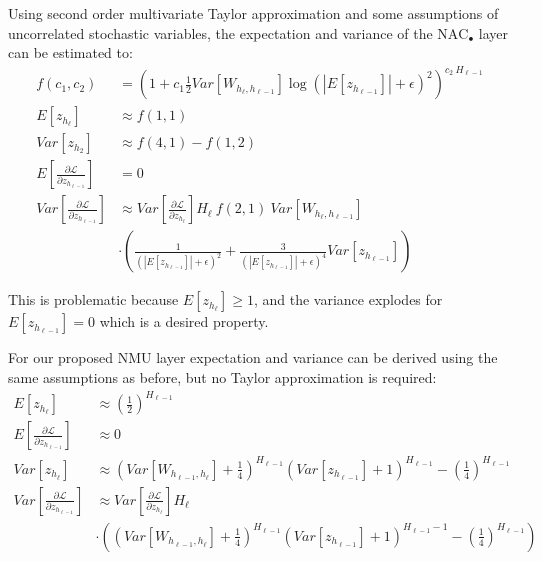 Using second order multivariate Taylor approximation and some assumptions of uncorrelated stochastic variables, the expectation and variance of the $\mathrm{NAC}_{\bullet}$ layer can be estimated to:
\begin{equation}
\begin{aligned}
f(c_1, c_2) &= \left(1 + c_1 \frac{1}{2} Var[W_{h_\ell, h_{\ell-1}}] \log(|E[z_{h_{\ell-1}}]| + \epsilon)^2\right)^{c_2\ H_{\ell-1}} \\
E[z_{h_\ell}] &\approx f\left(1, 1\right) \\
Var[z_{h_2}] &\approx f\left(4, 1\right) - f\left(1, 2\right) \\
E\left[\frac{\partial \mathcal{L}}{\partial z_{h_{\ell-1}}}\right] &= 0 \\
Var\left[\frac{\partial \mathcal{L}}{\partial z_{h_{\ell-1}}}\right] &\approx Var\left[\frac{\partial \mathcal{L}}{\partial z_{h_{\ell}}}\right] H_{\ell}\ f\left(2, 1\right)\ Var[W_{h_{\ell}, h_{\ell-1}}] \\
&\cdot \left(\frac{1}{\left(|E[z_{h_{\ell-1}}]| + \epsilon\right)^2} + \frac{3}{\left(|E[z_{h_{\ell-1}}]| + \epsilon\right)^4} Var[z_{h_{\ell-1}}]\right)
\end{aligned}
\end{equation}

This is problematic because $E[z_{h_\ell}] \ge 1$, and the variance explodes for $E[z_{h_{\ell-1}}] = 0$ which is a desired property.

For our proposed NMU layer expectation and variance can be derived using the same assumptions as before, but no Taylor approximation is required:
\begin{equation}
\begin{aligned}
E[z_{h_\ell}] &\approx \left(\frac{1}{2}\right)^{H_{\ell-1}} \\
E\left[\frac{\partial \mathcal{L}}{\partial z_{h_{\ell-1}}}\right] &\approx 0 \\
Var[z_{h_\ell}] &\approx \left(Var[W_{h_{\ell-1},h_\ell}] + \frac{1}{4}\right)^{H_{\ell-1}} \left(Var[z_{h_{\ell-1}}] + 1\right)^{H_{\ell-1}} - \left(\frac{1}{4}\right)^{H_{\ell-1}} \\
Var\left[\frac{\partial \mathcal{L}}{\partial z_{h_{\ell-1}}}\right] &\approx Var\left[\frac{\partial \mathcal{L}}{\partial z_{h_\ell}}\right] H_\ell \\
& \cdot \left( \left(Var[W_{h_{\ell-1},h_\ell}] + \frac{1}{4}\right)^{H_{\ell-1}} \left(Var[z_{h_{\ell-1}}] + 1\right)^{H_{\ell-1}-1} - \left(\frac{1}{4}\right)^{H_{\ell-1}}\right)
\end{aligned}
\end{equation}


